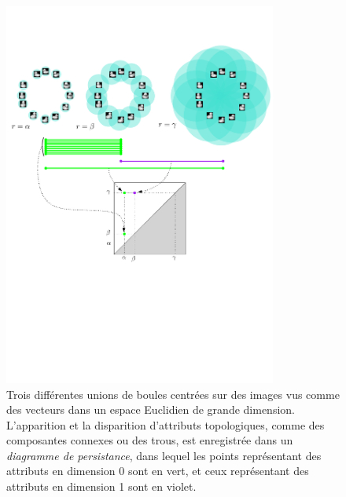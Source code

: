 

\begin{figure}[h]\centering
\includegraphics[width=0.8\textwidth]{figures/ExamplePersistence}
\caption[Diagrames de persistance induit par des boules grossissantes]{\label{fig:ExemplePersistance} 
Trois diff\'erentes unions de boules centr\'ees sur des images vus comme des vecteurs dans un espace Euclidien de grande dimension.
L'apparition et la disparition d'attributs topologiques, comme des composantes connexes ou des trous, est enregistr\'ee dans un {\em diagramme de persistance},
dans lequel les points repr\'esentant des attributs en dimension 0 sont en vert, et ceux repr\'esentant des attributs en dimension 1 sont en violet.}
\end{figure}

